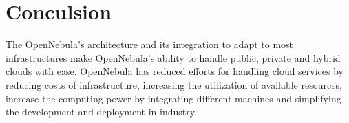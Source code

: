 \documentclass[9pt,twocolumn,twoside]{styles/osajnl}
\begin{document}
\section{Conculsion}

The OpenNebula's architecture and its integration to adapt to most 
infrastructures make OpenNebula's ability to handle public, private and hybrid
clouds with ease. OpenNebula has reduced  efforts for handling cloud services 
 by reducing costs of infrastructure, increasing the utilization of available resources, 
increase the computing power by integrating different machines and simplifying the 
development and deployment in industry. 


\end{document}
